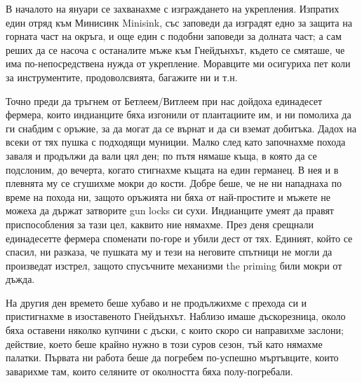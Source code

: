 \documentclass[12pt]{book}
\begin{document}
В началото на януари се захванахме с изграждането на укрепления. Изпратих един отряд към Минисинк Minisink, със заповеди да изградят едно за защита на горната част на окръга, и още един с подобни заповеди за долната част; а сам реших да се насоча с останалите мъже към Гнейдънхът, където се смяташе, че има по-непосредствена нужда от укрепление. Моравците ми осигуриха пет коли за инструментите, продоволсвията, багажите ни и т.н. 

Точно преди да тръгнем от Бетлеем/Витлеем при нас дойдоха единадесет фермера, които индианците бяха изгонили от плантациите им, и ни помолиха да ги снабдим с оръжие, за да могат да се върнат и да си вземат добитъка. Дадох на всеки от тях пушка с подходящи муниции. Малко след като започнахме похода заваля и продължи да вали цял ден; по пътя нямаше къща, в която да се подслоним, до вечерта, когато стигнахме къщата на един германец. В нея и в плевнята му се сгушихме мокри до кости. Добре беше, че не ни нападнаха по време на похода ни, защото оръжията ни бяха от най-простите и мъжете не можеха да държат затворите gun locks си сухи. Индианците умеят да правят приспособления за тази цел, каквито ние нямахме. През деня срещнали единадесетте фермера споменати по-горе и убили дест от тях. Единият, който се спасил, ни разказа, че пушката му и тези на неговите спътници не могли да произведат изстрел, защото спусъчните механизми the priming били мокри от дъжда.

На другия ден времето беше хубаво и не продължихме с прехода си и пристигнахме в изоставеното Гнейдънхът. Наблизо имаше дъскорезница, около бяха оставени няколко купчини с дъски, с които скоро си направихме заслони; действие, което беше крайно нужно в този суров сезон, тъй като нямахме палатки. Първата ни работа беше да погребем по-успешно мъртъвците, които заварихме там, които селяните от околността бяха полу-погребали. 
\end{document}
